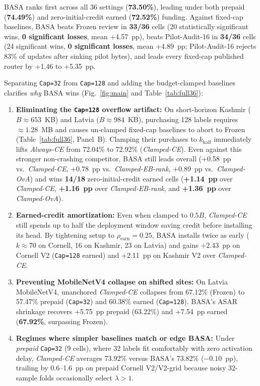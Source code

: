 \documentclass[preprint,12pt,authoryear]{elsarticle}
\begin{document}
BASA ranks first across all 36 settings (\textbf{73.50\%}), leading under both prepaid (\textbf{74.49\%}) and zero-initial-credit earned (\textbf{72.52\%}) funding. Against fixed-cap baselines, BASA beats Frozen review in \textbf{33/36} cells (20 statistically significant wins, \textbf{0 significant losses}, mean +4.57~pp), beats Pilot-Audit-16 in \textbf{34/36} cells (24 significant wins, \textbf{0 significant losses}, mean +4.89~pp; Pilot-Audit-16 rejects 83\% of updates after sinking pilot bytes), and leads every fixed-cap published router by +1.46 to +5.35~pp.

Separating \texttt{Cap=32} from \texttt{Cap=128} and adding the budget-clamped baselines clarifies \emph{why} BASA wins (Fig.~\ref{fig:main} and Table~\ref{tab:full36}):
\begin{enumerate}
  \item \textbf{Eliminating the \texttt{Cap=128} overflow artifact:} On short-horizon Kashmir ($B \approx 653$~KB) and Latvia ($B \approx 984$~KB), purchasing 128 labels requires $\approx 1.28$~MB and causes un-clamped fixed-cap baselines to abort to Frozen (Table~\ref{tab:full36}, Panel~B). Clamping their purchases to $k_{\mathrm{half}}$ immediately lifts \emph{Always-CE} from 72.04\% to 72.92\% (\emph{Clamped-CE}). Even against this stronger non-crashing competitor, BASA still leads overall (+0.58~pp vs.\ \emph{Clamped-CE}, +0.78~pp vs.\ \emph{Clamped-EB-rank}, +0.89~pp vs.\ \emph{Clamped-OvA}) and wins \textbf{14/18} zero-initial-credit earned cells (\textbf{+1.14~pp} over \emph{Clamped-CE}, \textbf{+1.16~pp} over \emph{Clamped-EB-rank}, and \textbf{+1.36~pp} over \emph{Clamped-OvA}).
  \item \textbf{Earned-credit amortization:} Even when clamped to $0.5B$, \emph{Clamped-CE} still spends up to half the deployment window saving credit before installing its head. By tightening setup to $\rho_{\mathrm{earn}} = 0.25$, BASA installs twice as early ($k \approx 70$ on Cornell, 16 on Kashmir, 23 on Latvia) and gains +2.43~pp on Cornell V2 (\texttt{Cap=128} earned) and +2.11~pp on Kashmir V2 over \emph{Clamped-CE}.
  \item \textbf{Preventing MobileNetV4 collapse on shifted sites:} On Latvia MobileNetV4, unanchored \emph{Clamped-CE} collapses from 67.12\% (Frozen) to 57.47\% prepaid (\texttt{Cap=32}) and 60.38\% earned (\texttt{Cap=128}). BASA's ASAR shrinkage recovers +5.75~pp prepaid (63.22\%) and +7.54~pp earned (\textbf{67.92\%}, surpassing Frozen).
  \item \textbf{Regimes where simpler baselines match or edge BASA:} Under \emph{prepaid} \texttt{Cap=32} (9 cells), where 32 labels fit comfortably with zero activation delay, \emph{Clamped-CE} averages 73.92\% versus BASA's 73.82\% ($-0.10$~pp), trailing by 0.6--1.6~pp on prepaid Cornell V2/V2-grid because noisy 32-sample folds occasionally select $\lambda > 1$.
\end{enumerate}
\end{document}
